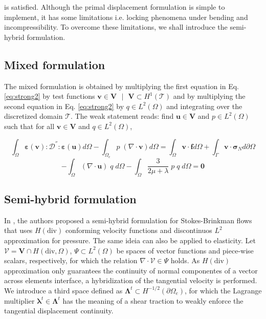\documentclass{wccm2024}
\begin{document}
\noindent is satisfied. Although the primal displacement formulation is simple to implement, it has some limitations i.e. locking phenomena under bending and incompressibility. To overcome these limitations, we shall introduce the semi-hybrid formulation.

\subsection{Mixed formulation}
The mixed formulation is obtained by multiplying the first equation in Eq. \eqref{eq:strong2} by test functions $\mathbf{v} \in \mathbf{V}\text{ } | \text{ }\mathbf{V} \subset H^1(\mathcal{T})$ and by multiplying the second equation in Eq. \eqref{eq:strong2} by $q\in L^2(\Omega)$ and integrating over the discretized domain $\mathcal{T}$. The weak statement reads: find $\mathbf{u} \in \mathbf{V}$ and $p\in L^2(\Omega)$ such that for all $\mathbf{v} \in \mathbf{V}$ and $q\in L^2(\Omega)$,

\begin{equation} \label{eq:mixedA}
        \int_{\Omega} \boldsymbol{\varepsilon}(\mathbf{v}) : \mathcal{D}^{''} : \boldsymbol{\varepsilon}(\mathbf{u}) d\Omega - \int_{\Omega_e} p \;(\nabla \cdot \mathbf{v}) d\Omega =  \int_{\Omega} \mathbf{v} \cdot \mathbf{f} d\Omega + \int_{\Gamma} \mathbf{v} \cdot \boldsymbol{\sigma}_N d\partial\Omega
\end{equation}
\begin{equation} \label{eq:mixedB}
    -\int_{\Omega} (\nabla \cdot \mathbf{u}) \;q\; d\Omega -\int_{\Omega} \frac{3}{2\mu+\lambda}\;p \;q\; d\Omega = \mathbf{0}
\end{equation}

\subsection{Semi-hybrid formulation}

In \cite{carvalho2024semi}, the authors proposed a semi-hybrid formulation for Stokes-Brinkman flows that uses $H(\text{div})$ conforming velocity functions and discontinuos $L^2$ approximation for pressure. The same ideia can also be applied to elasticity. Let $\mathcal{V} = \mathbf{V}\cap H(\text{div},\Omega)$, $\Psi \subset L^2(\Omega)$ be spaces of vector functions and piece-wise scalars, respectively, for which the relation $\nabla \cdot \mathcal{V} \in \Psi$ holds. As $H(\text{div})$ approximation only guarantees the continuity of normal componentes of a vector across elements interface, a hybridization of the tangential velocity is performed. We introduce a third space defined as $\boldsymbol{\Lambda}^t \subset H^{-1/2}(\partial\Omega_e)$, for which the Lagrange multiplier $\boldsymbol{\lambda}^t \in \boldsymbol{\Lambda}^t$ has the meaning of a shear traction to weakly enforce the tangential displacement continuity. 
\end{document}
